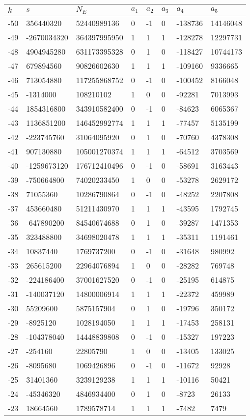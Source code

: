 \documentclass{amsart}
\begin{document}
\begin{longtable}{|l|l|l|lllll|}
\hline
$k$ & $s$ & $N_E$ & $a_1$ & $a_2$ & $a_3$ & $a_4$ & $a_5$\\
\hline
-50&356440320&52440989136&0&-1&0&-138736&14146048\\
-49&-2670034320&364397995950&1&1&1&-128278&12297731\\
-48&4904945280&631173395328&0&1&0&-118427&10744173\\
-47&679894560&90826602630&1&1&1&-109160&9336665\\
-46&713054880&117255868752&0&-1&0&-100452&8166048\\
-45&-1314000&108210102&1&0&0&-92281&7013993\\
-44&1854316800&343910582400&0&-1&0&-84623&6065367\\
-43&1136851200&146452992774&1&1&1&-77457&5135199\\
-42&-223745760&31064095920&0&1&0&-70760&4378308\\
-41&907130880&105001270374&1&1&1&-64512&3703569\\
-40&-1259673120&176712410496&0&-1&0&-58691&3163443\\
-39&-750664800&74020233450&1&0&0&-53278&2629172\\
-38&71055360&10286790864&0&-1&0&-48252&2207808\\
-37&453660480&51211430970&1&1&1&-43595&1792745\\
-36&-647890200&84540674688&0&1&0&-39287&1471353\\
-35&323488800&34698020478&1&1&1&-35311&1191461\\
-34&10837440&1769737200&0&-1&0&-31648&980992\\
-33&265615200&22964076894&1&0&0&-28282&769748\\
-32&-224186400&37001627520&0&-1&0&-25195&614875\\
-31&-140037120&14800006914&1&1&1&-22372&459989\\
-30&55209600&5875157904&0&1&0&-19796&350172\\
-29&-8925120&1028194050&1&1&1&-17453&258131\\
-28&-104378040&14448839808&0&-1&0&-15327&197223\\
-27&-254160&22805790&1&0&0&-13405&133025\\
-26&-8095680&1069426896&0&-1&0&-11672&92928\\
-25&31401360&3239129238&1&1&1&-10116&50421\\
-24&-45346320&4846934400&0&1&0&-8723&26133\\
-23&18664560&1789578714&1&1&1&-7482&7479\\

\end{longtable}
\end{document}

